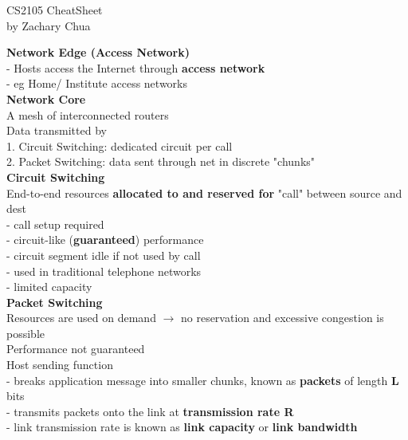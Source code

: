 \documentclass[10pt, a4paper]{article}
\author{Zachary Chua Yan Ern}
\date{22 September 2021}
\newcommand{\highlight}[1]{{\color{red}\textbf{#1}}}
\begin{document}
	\scriptsize %
	\setlength\parindent{0pt}
	\setlength{\columnseprule}{0.1pt}
	
	\begin{center}
		{\large CS2105 CheatSheet}\\
		by Zachary Chua
	\end{center}
	
	\begin{multicols*}{3}
		\textbf{Network Edge (Access Network)}\\
		- Hosts access the Internet through \highlight{access network}\\
		- eg Home/ Institute access networks\\

		\textbf{Network Core}\\
		A mesh of interconnected routers\\
		Data transmitted by\\
		1. Circuit Switching: dedicated circuit per call\\
		2. Packet Switching: data sent through net in discrete "chunks"\\
		
		\textbf{Circuit Switching}\\
		End-to-end resources \highlight{allocated to and reserved for} "call" between source and dest\\
		- call setup required\\
		- circuit-like (\highlight{guaranteed}) performance\\
		- circuit segment idle if not used by call\\
		- used in traditional telephone networks\\
		- limited capacity\\
		
		\textbf{Packet Switching}\\
		Resources are used on demand $\rightarrow$ no reservation and excessive congestion is possible\\
		Performance not guaranteed\\
		Host sending function\\
		- breaks application message into smaller chunks, known as \highlight{packets} of length \highlight{L} bits\\
		- transmits packets onto the link at \highlight{transmission rate R}\\
		- link transmission rate is known as \highlight{link capacity} or \highlight{link bandwidth}\\
		

\end{multicols*}
\end{document}
